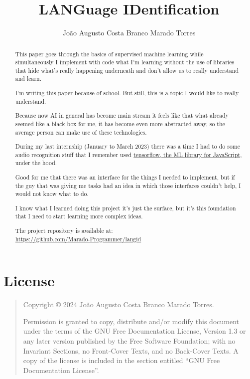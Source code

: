 \documentclass[a4paper,12pt]{article}
\title{LANGuage IDentification}
\author{João Augusto Costa Branco Marado Torres}
\newcommand{\copyrightnotice}{
    Copyright \copyright{}  2024  João Augusto Costa Branco Marado Torres.
}
\newcommand{\licensenotice}{
    \copyrightnotice
    Permission is granted to copy, distribute and/or modify this document
    under the terms of the GNU Free Documentation License, Version 1.3
    or any later version published by the Free Software Foundation;
    with no Invariant Sections, no Front-Cover Texts, and no Back-Cover Texts.
    A copy of the license is included in the section entitled ``GNU
    Free Documentation License''.
}
\theoremstyle{mytheoremstyle}
\theoremstyle{mytheoremstyle}
\theoremstyle{myproblemstyle}
\begin{document}
    \maketitle

    \begin{abstract}
        This paper goes through the basics of supervised machine learning while
        simultaneously I implement with code what I'm learning without the use
        of libraries that hide what's really happening underneath and don't
        allow us to really understand and learn.

        I'm writing this paper because of school. But still, this is a topic I
        would like to really understand.

        Because now AI in general has become main stream it feels like that
        what already seemed like a black box for me, it has become even more
        abstracted away, so the average person can make use of these
        technologies.

        During my last internship (January to March 2023) there was a time I
        had to do some audio recognition stuff that I remember used
        \href{https://www.tensorflow.org/js}{tensorflow, the ML library for
        JavaScript}, under the hood.

        Good for me that there was an interface for the things I needed to
        implement, but if the guy that was giving me tasks had an idea in which
        those interfaces couldn't help, I would not know what to do.

        I know what I learned doing this project it's just the surface, but
        it's this foundation that I need to start learning more complex ideas.

        The project repository is available at: \\
        \url{https://github.com/Marado-Programmer/langid}
    \end{abstract}

    \section*{License}

    \bigskip
    \begin{quote}
        \licensenotice
    \end{quote}
    \bigskip

    \tableofcontents

\end{document}
